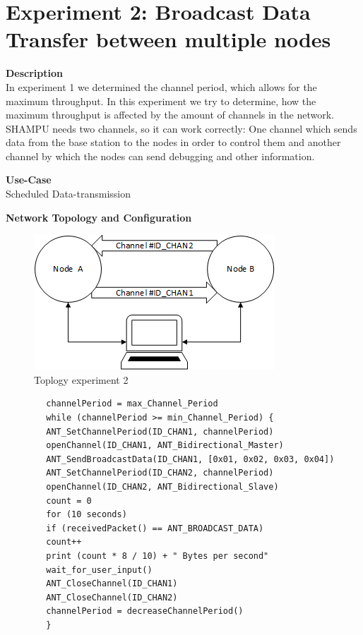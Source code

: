 \section{Experiment 2: Broadcast Data Transfer between multiple nodes}
\begin{description} 
	\item{\textbf{Description}} \hfill \\ In experiment 1 we determined the channel period, which allows for the maximum throughput. In this experiment we try to determine, how the maximum throughput is affected by the amount of channels in the network. SHAMPU needs two channels, so it can work correctly: One channel which sends data from the base station to the nodes in order to control them and another channel by which the nodes can send debugging and other information.
	\item{\textbf{Use-Case}} \hfill \\ Scheduled Data-transmission	
	\item{\textbf{Network Topology and Configuration}} \hfill
	\begin{figure}[H]
		\centering
		\includegraphics[scale=1]{content/images/exp2_topo.png}
		\caption{Toplogy experiment 2}
	\end{figure}
	\begin{code}[H]
		\begin{verbatim}
		channelPeriod = max_Channel_Period
		while (channelPeriod >= min_Channel_Period) {
		ANT_SetChannelPeriod(ID_CHAN1, channelPeriod)
		openChannel(ID_CHAN1, ANT_Bidirectional_Master)
		ANT_SendBroadcastData(ID_CHAN1, [0x01, 0x02, 0x03, 0x04])
		ANT_SetChannelPeriod(ID_CHAN2, channelPeriod)
		openChannel(ID_CHAN2, ANT_Bidirectional_Slave)
		count = 0
		for (10 seconds) 
		if (receivedPacket() == ANT_BROADCAST_DATA)
		count++			
		print (count * 8 / 10) + " Bytes per second"
		wait_for_user_input()
		ANT_CloseChannel(ID_CHAN1)
		ANT_CloseChannel(ID_CHAN2)
		channelPeriod = decreaseChannelPeriod()
		}
		\end{verbatim}
		\caption{Broadcast data transfer two channels (Master)}\label{lst:mExp2}
	\end{code}
	

\end{description}
